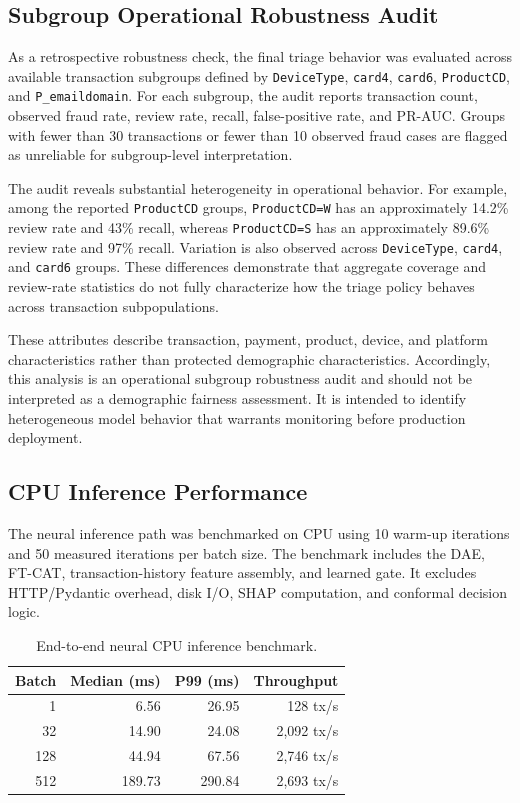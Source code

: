 \documentclass[conference]{IEEEtran}
\begin{document}
\subsection{Subgroup Operational Robustness Audit}

As a retrospective robustness check, the final triage behavior was evaluated
across available transaction subgroups defined by \texttt{DeviceType},
\texttt{card4}, \texttt{card6}, \texttt{ProductCD}, and
\texttt{P\_emaildomain}. For each subgroup, the audit reports transaction count,
observed fraud rate, review rate, recall, false-positive rate, and PR-AUC.
Groups with fewer than 30 transactions or fewer than 10 observed fraud cases
are flagged as unreliable for subgroup-level interpretation.

The audit reveals substantial heterogeneity in operational behavior. For
example, among the reported \texttt{ProductCD} groups,
\texttt{ProductCD=W} has an approximately 14.2\% review rate and 43\% recall,
whereas \texttt{ProductCD=S} has an approximately 89.6\% review rate and 97\%
recall. Variation is also observed across \texttt{DeviceType},
\texttt{card4}, and \texttt{card6} groups. These differences demonstrate that
aggregate coverage and review-rate statistics do not fully characterize how
the triage policy behaves across transaction subpopulations.

These attributes describe transaction, payment, product, device, and platform
characteristics rather than protected demographic characteristics.
Accordingly, this analysis is an operational subgroup robustness audit and
should not be interpreted as a demographic fairness assessment. It is intended
to identify heterogeneous model behavior that warrants monitoring before
production deployment.

\subsection{CPU Inference Performance}

The neural inference path was benchmarked on CPU using 10 warm-up iterations and
50 measured iterations per batch size. The benchmark includes the DAE, FT-CAT,
transaction-history feature assembly, and learned gate. It excludes HTTP/Pydantic
overhead, disk I/O, SHAP computation, and conformal decision logic.

\begin{table}[t]
\caption{End-to-end neural CPU inference benchmark.}
\label{tab:latency}
\centering
\begin{tabular}{@{}rrrr@{}}
\toprule
Batch & Median (ms) & P99 (ms) & Throughput \\
\midrule
1   & 6.56   & 26.95  & 128 tx/s \\
32  & 14.90  & 24.08  & 2,092 tx/s \\
128 & 44.94  & 67.56  & 2,746 tx/s \\
512 & 189.73 & 290.84 & 2,693 tx/s \\
\bottomrule
\end{tabular}
\end{table}
\end{document}
